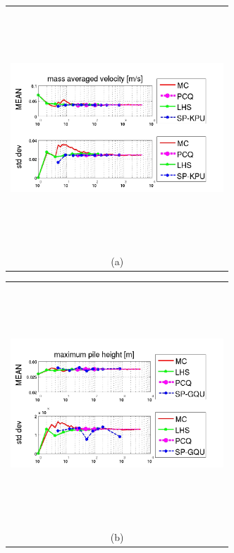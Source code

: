 \documentclass{article}
\newcommand{\Pic}[2][0.85]{\begin{center}\texttt{[image: \#2]}
 \end{center} }
\begin{document}
\begin{figure}[H]
      \begin{minipage}[b]{0.6\textwidth}
        \begin{tabular}{c}
       \includegraphics[width=8cm,height=9cm,keepaspectratio]{fig/picskpu/unu_KPU.jpg}\\
        (a)
        \end{tabular}
    \end{minipage}
      \begin{minipage}[b]{0.6\textwidth}
        \begin{tabular}{c}
       \includegraphics[width=8cm,height=9cm,keepaspectratio]{fig/picsgqu/doi_GQU.jpg}\\
        (b)

\end{tabular}
\end{minipage}
\end{figure}
\end{document}
